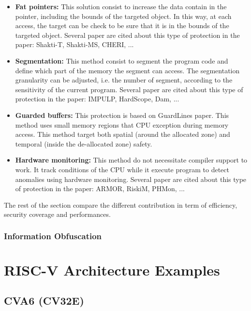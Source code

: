 \documentclass{book}
\begin{document}
				\begin{itemize}
					\item \textbf{Fat pointers:} This solution consist to increase the data contain in the pointer, including the bounds of the targeted object. In this way, at each access, the target can be check to be sure that it is in the bounds of the targeted object. {\color{red} Several paper are cited about this type of protection in the paper: Shakti-T, Shakti-MS, CHERI, ...}
					
					\item \textbf{Segmentation:} This method consist to segment the program code and define which part of the memory the segment can access. The segmentation granularity can be adjusted, i.e. the number of segment, according to the sensitivity of the current program.{\color{red} Several paper are cited about this type of protection in the paper: IMPULP, HardScope, Dam, ...}
					
					\item \textbf{Guarded buffers:} This protection is based on GuardLines paper. This method uses small memory regions that CPU exception during memory access. This method target both spatial (around the allocated zone) and temporal (inside the de-allocated zone) safety.
					
					\item \textbf{Hardware monitoring:} This method do not necessitate compiler support to work. It track conditions of the CPU while it execute program to detect anomalies using hardware monitoring. {\color{red} Several paper are cited about this type of protection in the paper:  ARMOR, RiskiM, PHMon, ...}
				\end{itemize}
				
				The rest of the section compare the different contribution in term of efficiency, security coverage and performances.
				
			\subsection{Information Obfuscation}
			
	
	\chapter{RISC-V Architecture Examples}
	
		\section{CVA6 (CV32E)}
		
\end{document}
